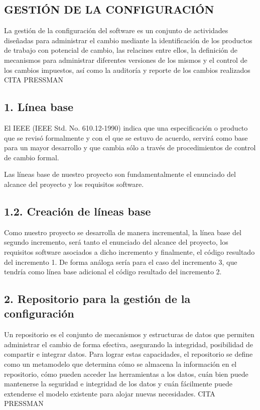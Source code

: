 \documentclass{article}
\title{}
\begin{document}
\subsection{GESTI\'ON DE LA CONFIGURACI\'ON}

\bigskip

La gesti\'on de la configuraci\'on del software es un conjunto de actividades dise\~nadas para administrar el cambio mediante la identificaci\'on de los productos de trabajo con potencial de cambio, las relacines entre ellos, la definici\'on de mecanismos para administrar diferentes versiones de los mismos y el control de los cambios impuestos, as\'i como la auditor\'ia y reporte de los cambios realizados CITA PRESSMAN


\bigskip

\subsection{1. L\'inea base}
El IEEE (IEEE Std. No. 610.12-1990) indica que una especificaci\'on o producto que se revis\'o formalmente y con el que se estuvo de acuerdo, servir\'a como base para un mayor desarrollo y que cambia s\'olo a trav\'es de procedimientos de control de cambio formal.

Las l\'ineas base de nuestro proyecto son fundamentalmente el enunciado del alcance del proyecto y los requisitos software.


\bigskip

\subsection{1.2. Creaci\'on de l\'ineas base}
Como nuestro proyecto se desarrolla de manera incremental, la l\'inea base del segundo incremento, ser\'a tanto el enunciado del alcance del proyecto, los requisitos software asociados a dicho incremento y finalmente, el c\'odigo resultado del incremento 1. De forma an\'aloga ser\'ia para el caso del incremento 3, que tendr\'ia como l\'inea base adicional el c\'odigo resultado del incremento 2.


\bigskip

\subsection[2. Repositorio para la gesti\'on de la configuraci\'on]{2. Repositorio para la gesti\'on de la configuraci\'on}
Un repositorio es el conjunto de mecanismos y estructuras de datos que permiten administrar el cambio de forma efectiva, asegurando la integridad, posibilidad de compartir e integrar datos. Para lograr estas capacidades, el repositorio se define como un metamodelo que determina c\'omo se almacena la informaci\'on en el repositorio, c\'omo pueden acceder las herramientas a los datos, cu\'an bien puede mantenerse la seguridad e integridad de los datos y cu\'an f\'acilmente puede extenderse el modelo existente para alojar nuevas necesidades. CITA PRESSMAN
\end{document}
